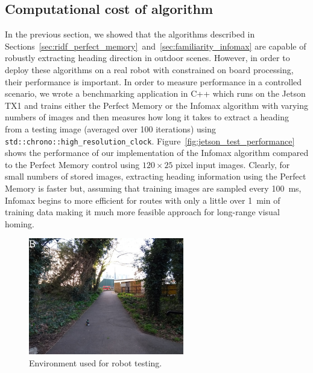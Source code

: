 \documentclass[letterpaper]{article}
\begin{document}
\subsection{Computational cost of algorithm}
In the previous section, we showed that the algorithms described in Sections~\ref{sec:ridf_perfect_memory}~and~\ref{sec:familiarity_infomax} are capable of robustly extracting heading direction in outdoor scenes. 
However, in order to deploy these algorithms on a real robot with constrained on board processing, their performance is important. 
In order to measure performance in a controlled scenario, we wrote a benchmarking application in C++ which runs on the Jetson TX1 and trains either the Perfect Memory or the Infomax algorithm with varying numbers of images and then measures how long it takes to extract a heading from a testing image (averaged over \num{100} iterations) using \lstinline{std::chrono::high_resolution_clock}.
Figure~\ref{fig:jetson_test_performance} shows the performance of our implementation of the Infomax algorithm compared to the Perfect Memory control using $120 \times 25$ pixel input images.
Clearly, for small numbers of stored images, extracting heading information using the Perfect Memory is faster but, assuming that training images are sampled every \SI{100}{\milli\second}, Infomax begins to more efficient for routes with only a little over \SI{1}{\minute} of training data making it much more feasible approach for long-range visual homing.

\begin{figure}[t]
    \centering
    \includegraphics[height=2in]{figures/robot_environment.jpg}
    \caption{Environment used for robot testing.}
    \label{fig:robot_environment}
\end{figure}
\end{document}
